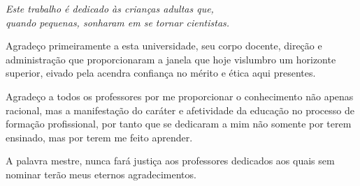 
\begin{dedicatoria}
	\vspace*{\fill}
	\centering
	\noindent
	\textit{ Este trabalho é dedicado às crianças adultas que,\\
		quando pequenas, sonharam em se tornar cientistas.} \vspace*{\fill}
\end{dedicatoria}

\begin{agradecimentos}

	Agradeço primeiramente a esta universidade, seu corpo docente, direção e administração que proporcionaram a janela que hoje vislumbro um horizonte superior, eivado pela acendra confiança no mérito e ética aqui presentes. 
	
	Agradeço a todos os professores por me proporcionar o conhecimento não apenas racional, mas a manifestação do caráter e afetividade da educação no processo de formação profissional, por tanto que se dedicaram a mim não somente por terem ensinado, mas por terem me feito aprender.
	
	A palavra mestre, nunca fará justiça aos professores dedicados aos quais sem nominar terão meus eternos agradecimentos.

\end{agradecimentos}